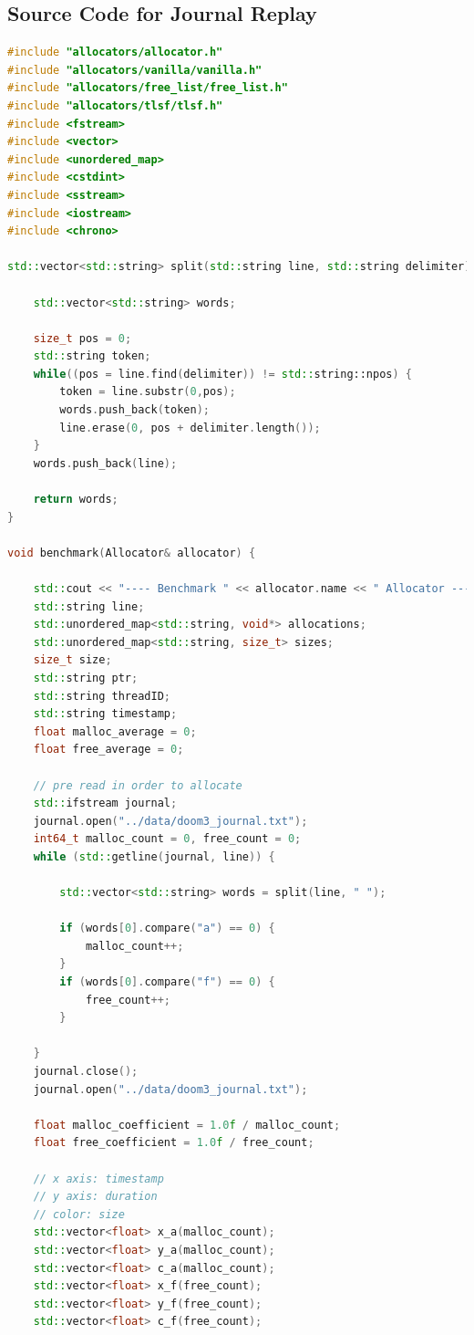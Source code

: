 \documentclass{article}
\begin{document}
\begin{appendices}
	\section[A]{Source Code for Journal Replay}
	\begin{lstlisting}[language=C++]
#include "allocators/allocator.h"
#include "allocators/vanilla/vanilla.h"
#include "allocators/free_list/free_list.h"
#include "allocators/tlsf/tlsf.h"
#include <fstream>
#include <vector>
#include <unordered_map>
#include <cstdint>
#include <sstream>
#include <iostream>
#include <chrono>
	
std::vector<std::string> split(std::string line, std::string delimiter) {
	
	std::vector<std::string> words;
		
	size_t pos = 0;
	std::string token;
	while((pos = line.find(delimiter)) != std::string::npos) {
		token = line.substr(0,pos);
		words.push_back(token);
		line.erase(0, pos + delimiter.length());
	}
	words.push_back(line);
		
	return words;
}
	
void benchmark(Allocator& allocator) {
		
	std::cout << "---- Benchmark " << allocator.name << " Allocator ----" << std::endl;
	std::string line;
	std::unordered_map<std::string, void*> allocations;
	std::unordered_map<std::string, size_t> sizes;
	size_t size;
	std::string ptr;
	std::string threadID;
	std::string timestamp;
	float malloc_average = 0;
	float free_average = 0;
		
	// pre read in order to allocate
	std::ifstream journal;
	journal.open("../data/doom3_journal.txt");
	int64_t malloc_count = 0, free_count = 0;
	while (std::getline(journal, line)) {
			
		std::vector<std::string> words = split(line, " ");
			
		if (words[0].compare("a") == 0) {
			malloc_count++;
		}
		if (words[0].compare("f") == 0) {
			free_count++;
		}
			
	}
	journal.close();
	journal.open("../data/doom3_journal.txt");
		
	float malloc_coefficient = 1.0f / malloc_count;
	float free_coefficient = 1.0f / free_count;
		
	// x axis: timestamp
	// y axis: duration
	// color: size
	std::vector<float> x_a(malloc_count);
	std::vector<float> y_a(malloc_count);
	std::vector<float> c_a(malloc_count);
	std::vector<float> x_f(free_count);
	std::vector<float> y_f(free_count);
	std::vector<float> c_f(free_count);
		

\end{lstlisting}
\end{appendices}
\end{document}
